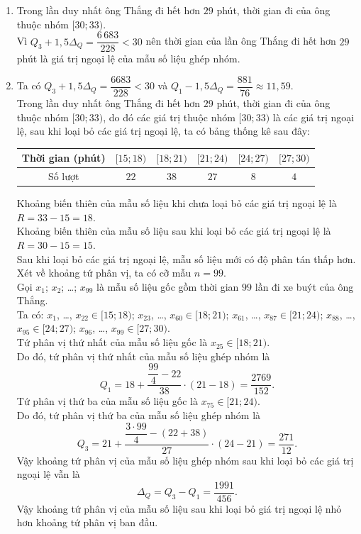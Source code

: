 \begin{bt}
{\begin{enumerate}
				$$Q_3=21+\dfrac{\dfrac{3\cdot100}{4}-(22+38)}{27}\cdot(24-21)=\dfrac{68}{3}.$$
				Vậy khoảng tứ phân vị của mẫu số liệu ghép nhóm là $$\Delta_Q=Q_3-Q_1=\dfrac{505}{114}.$$
				\item Trong lần duy nhất ông Thắng đi hết hơn $29$ phút, thời gian đi của ông thuộc nhóm $[30;33)$.\\
				Vì $Q_3+1{,}5\Delta_Q=\dfrac{6\,683}{228}<30$ nên thời gian của lần ông Thắng đi hết hơn $29$ phút là giá trị ngoại lệ của mẫu số liệu ghép nhóm.
				\item 
				Ta có $Q_3+1{,}5\Delta_Q=\dfrac{6683}{228}<30$ và $Q_1-1{,}5\Delta_Q=\dfrac{881}{76}\approx11{,}59$.\\
				Trong lần duy nhất ông Thắng đi hết hơn $29$ phút, thời gian đi của ông thuộc nhóm $[30;33)$, do đó các giá trị thuộc nhóm $[30;33)$ là các giá trị ngoại lệ, sau khi loại bỏ các giá trị ngoại lệ, ta có bảng thống kê sau đây:
				\begin{center}
					\begin{tabular}{|c|c|c|c|c|c|}
						\hline
						Thời gian (phút) & $[15;18)$ & $[18;21)$ & $[21;24)$ & $[24;27)$ & $[27;30)$ \\
						\hline
						Số lượt & $22$ & $38$ & $27$ & $8$ & $4$ \\
						\hline
					\end{tabular}
				\end{center}
				Khoảng biến thiên của mẫu số liệu khi chưa loại bỏ các giá trị ngoại lệ là $R=33-15=18$.\\
				Khoảng biến thiên của mẫu số liệu sau khi loại bỏ các giá trị ngoại lệ là $R=30-15=15$.\\
				Sau khi loại bỏ các giá trị ngoại lệ, mẫu số liệu mới có độ phân tán thấp hơn.\\
				Xét về khoảng tứ phân vị, ta có cỡ mẫu $n=99$.\\
				Gọi $x_1$; $x_2$; \ldots; $x_{99}$ là mẫu số liệu gốc gồm thời gian $99$ lần đi xe buýt của ông Thắng.\\ Ta có: $x_1$, \ldots, $x_{22}\in[15;18)$; $x_{23}$, \ldots, $x_{60}\in[18;21)$; $x_{61}$, \ldots, $x_{87}\in[21;24)$; $x_{88}$, \ldots, $x_{95}\in[24;27)$; $x_{96}$, \ldots, $x_{99}\in[27;30)$.\\
				Tứ phân vị thứ nhất của mẫu số liệu gốc là $x_{25}\in[18;21)$.\\ Do đó, tứ phân vị thứ nhất của mẫu số liệu ghép nhóm là
				$$Q_1=18+\dfrac{\dfrac{99}{4}-22}{38}\cdot(21-18)=\dfrac{2769}{152}.$$
				Tứ phân vị thứ ba của mẫu số liệu gốc là $x_{75}\in[21;24)$.\\ Do đó, tứ phân vị thứ ba của mẫu số liệu ghép nhóm là
				$$Q_3=21+\dfrac{\dfrac{3\cdot99}{4}-(22+38)}{27}\cdot(24-21)=\dfrac{271}{12}.$$
				Vậy khoảng tứ phân vị của mẫu số liệu ghép nhóm sau khi loại bỏ các giá trị ngoại lệ vẫn là $$\Delta_Q=Q_3-Q_1=\dfrac{1991}{456}.$$
				Vậy khoảng tứ phân vị của mẫu số liệu sau khi loại bỏ giá trị ngoại lệ nhỏ hơn khoảng tứ phân vị ban đầu.
		\end{enumerate}}
	\end{bt}
